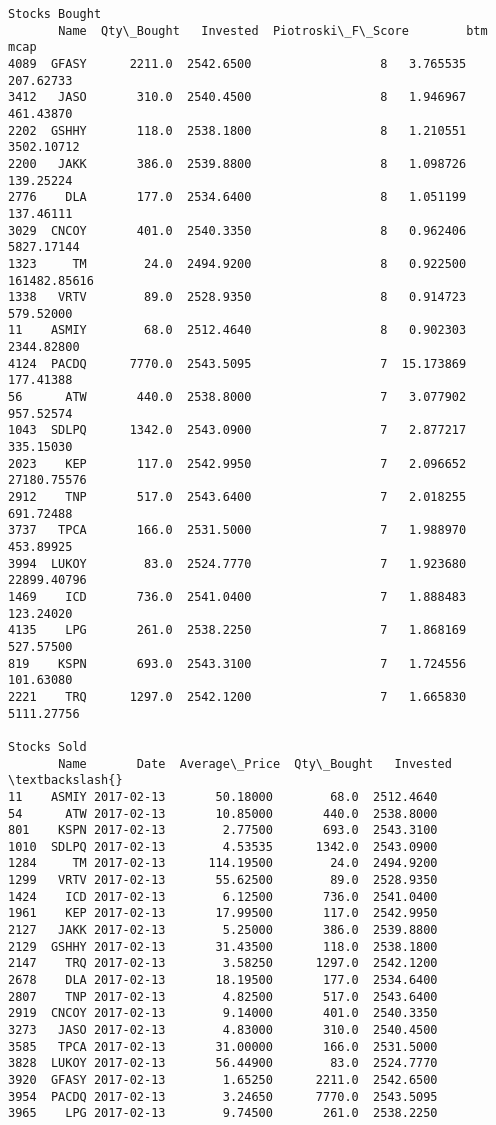 \documentclass[11pt]{article}
\begin{document}
\begin{Verbatim}[commandchars=\\\{\}]
Stocks Bought
       Name  Qty\_Bought   Invested  Piotroski\_F\_Score        btm          mcap
4089  GFASY      2211.0  2542.6500                  8   3.765535     207.62733
3412   JASO       310.0  2540.4500                  8   1.946967     461.43870
2202  GSHHY       118.0  2538.1800                  8   1.210551    3502.10712
2200   JAKK       386.0  2539.8800                  8   1.098726     139.25224
2776    DLA       177.0  2534.6400                  8   1.051199     137.46111
3029  CNCOY       401.0  2540.3350                  8   0.962406    5827.17144
1323     TM        24.0  2494.9200                  8   0.922500  161482.85616
1338   VRTV        89.0  2528.9350                  8   0.914723     579.52000
11    ASMIY        68.0  2512.4640                  8   0.902303    2344.82800
4124  PACDQ      7770.0  2543.5095                  7  15.173869     177.41388
56      ATW       440.0  2538.8000                  7   3.077902     957.52574
1043  SDLPQ      1342.0  2543.0900                  7   2.877217     335.15030
2023    KEP       117.0  2542.9950                  7   2.096652   27180.75576
2912    TNP       517.0  2543.6400                  7   2.018255     691.72488
3737   TPCA       166.0  2531.5000                  7   1.988970     453.89925
3994  LUKOY        83.0  2524.7770                  7   1.923680   22899.40796
1469    ICD       736.0  2541.0400                  7   1.888483     123.24020
4135    LPG       261.0  2538.2250                  7   1.868169     527.57500
819    KSPN       693.0  2543.3100                  7   1.724556     101.63080
2221    TRQ      1297.0  2542.1200                  7   1.665830    5111.27756

Stocks Sold
       Name       Date  Average\_Price  Qty\_Bought   Invested  \textbackslash{}
11    ASMIY 2017-02-13       50.18000        68.0  2512.4640
54      ATW 2017-02-13       10.85000       440.0  2538.8000
801    KSPN 2017-02-13        2.77500       693.0  2543.3100
1010  SDLPQ 2017-02-13        4.53535      1342.0  2543.0900
1284     TM 2017-02-13      114.19500        24.0  2494.9200
1299   VRTV 2017-02-13       55.62500        89.0  2528.9350
1424    ICD 2017-02-13        6.12500       736.0  2541.0400
1961    KEP 2017-02-13       17.99500       117.0  2542.9950
2127   JAKK 2017-02-13        5.25000       386.0  2539.8800
2129  GSHHY 2017-02-13       31.43500       118.0  2538.1800
2147    TRQ 2017-02-13        3.58250      1297.0  2542.1200
2678    DLA 2017-02-13       18.19500       177.0  2534.6400
2807    TNP 2017-02-13        4.82500       517.0  2543.6400
2919  CNCOY 2017-02-13        9.14000       401.0  2540.3350
3273   JASO 2017-02-13        4.83000       310.0  2540.4500
3585   TPCA 2017-02-13       31.00000       166.0  2531.5000
3828  LUKOY 2017-02-13       56.44900        83.0  2524.7770
3920  GFASY 2017-02-13        1.65250      2211.0  2542.6500
3954  PACDQ 2017-02-13        3.24650      7770.0  2543.5095
3965    LPG 2017-02-13        9.74500       261.0  2538.2250


\end{Verbatim}
\end{document}
